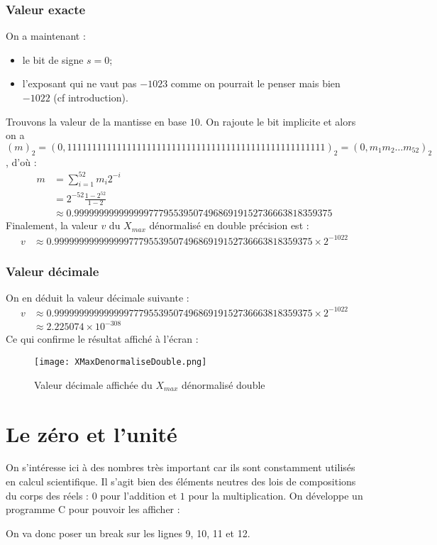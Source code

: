 \documentclass[a4paper, titlepage]{livret} %
\begin{document}
				\subsubsection{Valeur exacte}
					On a maintenant : 
					\begin{itemize}
						\item le bit de signe $s = 0$;
						\item l'exposant qui ne vaut pas $-1023$ comme on pourrait le penser mais bien $-1022$ (cf introduction).
					\end{itemize}
					Trouvons la valeur de la mantisse en base $10$.
					On rajoute le bit implicite et alors on a $(m)_{2} = (0,11111111 11111111 11111111 11111111 11111111 11111111 1111)_{2} = (0,m_{1}m_{2}…m_{52})_{2}$, d'où :
					\[\begin{aligned}
						m & = \sum_{i=1}^{52} m_{i}2^{-i}\\
						  & = 2^{-52}\frac{1 - 2^{52}}{1 - 2}\\
						  & \approx 0.9999999999999997779553950749686919152736663818359375
					\end{aligned}\]
					Finalement, la valeur $v$ du $X_{max}$ dénormalisé en double précision est :
					\[\begin{aligned}
						v & \approx 0.9999999999999997779553950749686919152736663818359375 \times 2^{-1022}
					\end{aligned}\]

				\subsubsection{Valeur décimale}
					On en déduit la valeur décimale suivante :
					\[\begin{aligned}
						v & \approx 0.9999999999999997779553950749686919152736663818359375 \times 2^{-1022}\\
						  & \approx 2.225074 \times 10^{-308}
					\end{aligned}\]
					Ce qui confirme le résultat affiché à l'écran :
					\begin{figure}[!h]
						\centering
  							\texttt{[image: XMaxDenormaliseDouble.png]}
  							\caption{Valeur décimale affichée du $X_{max}$ dénormalisé double}
					\end{figure}

		\section{Le zéro et l'unité}
			On s'intéresse ici à des nombres très important car ils sont constamment utilisés en calcul scientifique.
			Il s'agit bien des éléments neutres des lois de compositions du corps des réels : $0$ pour l'addition et $1$ pour la multiplication.
			On développe un programme C pour pouvoir les afficher :
			
			On va donc poser un break sur les lignes 9, 10, 11 et 12.
\end{document}

